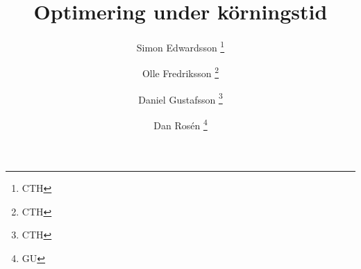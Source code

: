 \documentclass[leqno]{article}
\begin{document}

\title{Optimering under körningstid}
\date{}
\author{Simon  Edwardsson  \footnote{CTH}
   \and Olle   Fredriksson \footnote{CTH}
   \and Daniel Gustafsson  \footnote{CTH}
   \and Dan    Rosén       \footnote{GU}
   }
   
   
\maketitle

% 

\newpage

\tableofcontents

\newpage

















\newpage


\end{document}

